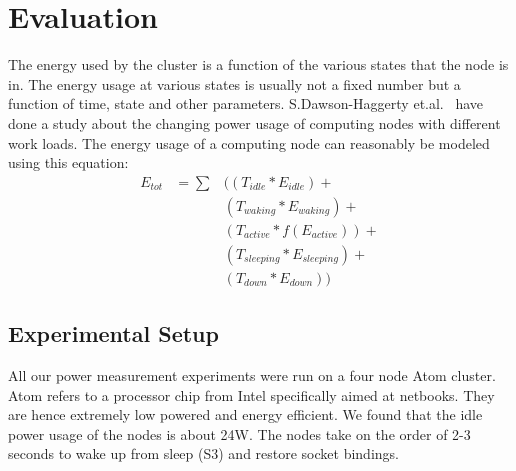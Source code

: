 \section{Evaluation} %
\label{sec:results}
The energy used by the cluster is a function of the various states that the node is in. The energy usage at various states is usually not a fixed number but a function of time, state and other parameters. S.Dawson-Haggerty et.al.~\cite{Dawson-Haggerty:09} have done a study about the changing power usage of computing nodes with different work loads. The energy usage of a computing node can reasonably be modeled using this equation:
\begin{eqnarray}
    E_{tot}  &= \sum &\big((T_{idle} * E_{idle}) + \nonumber \\
             &       &(T_{waking} * E_{waking}) + \nonumber \\
             &       &(T_{active} * f(E_{active})) + \nonumber \\
             &       &(T_{sleeping} * E_{sleeping}) + \nonumber \\
             &       &(T_{down} * E_{down}) \big)
\end{eqnarray}

\subsection{Experimental Setup} %
\label{sub:experimental_setup}
All our power measurement experiments were run on a four node Atom cluster. Atom refers to a processor chip from Intel specifically aimed at netbooks. They are hence extremely low powered and energy efficient. We found that the idle power usage of the nodes is about 24W. The nodes take on the order of 2-3 seconds to wake up from sleep (S3) and restore socket bindings. 

